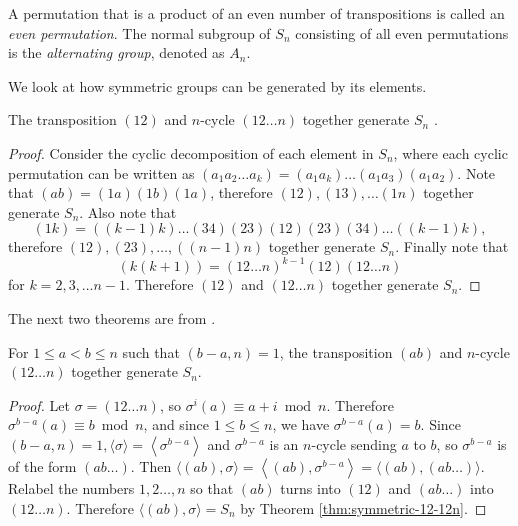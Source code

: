 \begin{definition}
	A permutation that is a product of an even number of transpositions is called an \textit{even permutation}. The normal subgroup of $S_n$ consisting of all even permutations is the \textit{alternating group}, denoted as $A_n$. 
\end{definition}

We look at how symmetric groups can be generated by its elements. 

\begin{theorem} \label{thm:symmetric-12-12n}
	The transposition $(12)$ and $n$-cycle $(12 \dots n)$ together generate $S_n$ . 
\end{theorem}
\begin{proof}
	Consider the cyclic decomposition of each element in $S_n$, where each cyclic permutation can be written as 
	$
	(a_1a_2\dots a_k) = (a_1 a_k) \dots (a_1 a_3) (a_1 a_2). 
	$
	Note that $(ab) = (1a)(1b)(1a)$, therefore $(12), (13), \ldots (1n)$ together generate $S_n$. Also note that  
	$$(1k)=((k-1)k)\dots(34)(23)(12)(23)(34)\dots((k-1)k),$$
	therefore $(12), (23), \dots, ((n-1)n)$ together generate $S_n$. Finally note that 
	$$
	(k(k+1)) = (12\dots n)^{k-1} (12) (12\dots n)
	$$
	for $k = 2, 3, \dots n - 1$. Therefore $(12)$ and $(12 \dots n)$ together generate $S_n$. 
\end{proof}

The next two theorems are from \cite{generating-sets}. 

\begin{theorem} \label{thm:symmetric-ab-12n}
	For $1 \le a < b \le n$ such that $(b - a, n) = 1$, the transposition $(ab)$ and $n$-cycle $(12 \dots n)$ together generate $S_n$.
\end{theorem}
\begin{proof}
	Let $\sigma=(12 \ldots n)$, so $\sigma^i(a) \equiv a+i \bmod n$. Therefore $\sigma^{b-a}(a) \equiv b \bmod n$, and since $1 \le b \le n$, we have $\sigma^{b-a}(a)=b$. Since $(b-a, n)=1,\langle\sigma\rangle=\left\langle\sigma^{b-a}\right\rangle$ and $\sigma^{b-a}$ is an $n$-cycle sending $a$ to $b$, so $\sigma^{b-a}$ is of the form $(a b \ldots)$. Then
	$
	\langle(a b), \sigma\rangle=\left\langle(a b), \sigma^{b-a}\right\rangle=\langle(a b),(a b \ldots)\rangle .
	$
	Relabel the numbers $1,2 \ldots, n$ so that $(a b)$ turns into $(12)$ and $(a b \ldots)$ into $(12 \ldots n)$. Therefore $\langle(a b), \sigma\rangle=S_n$ by Theorem \ref{thm:symmetric-12-12n}.
\end{proof}

